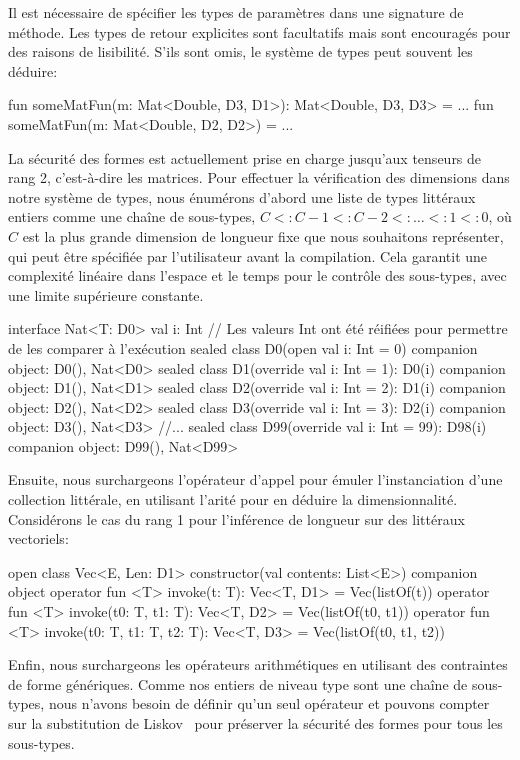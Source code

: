 %
Il est nécessaire de spécifier les types de paramètres dans une signature de méthode. Les types de retour explicites sont facultatifs mais sont encouragés pour des raisons de lisibilité. S'ils sont omis, le système de types peut souvent les déduire:
%
\begin{kotlinlisting}
fun someMatFun(m: Mat<Double, D3, D1>): Mat<Double, D3, D3> = ...
fun someMatFun(m: Mat<Double, D2, D2>) = ...
\end{kotlinlisting}
%
La sécurité des formes est actuellement prise en charge jusqu'aux tenseurs de rang 2, c'est-à-dire les matrices. Pour effectuer la vérification des dimensions dans notre système de types, nous énumérons d'abord une liste de types littéraux entiers comme une chaîne de sous-types, $C < : C - 1 < : C - 2 < : \dots < : 1 < : 0$, où $C$ est la plus grande dimension de longueur fixe que nous souhaitons représenter, qui peut être spécifiée par l'utilisateur avant la compilation. Cela garantit une complexité linéaire dans l'espace et le temps pour le contrôle des sous-types, avec une limite supérieure constante.
%
\begin{kotlinlisting}[caption={Type sécurisé pour les tenseurs de rang 1, $\forall C\leq2.$}]
interface Nat<T: D0> { val i: Int }
// Les valeurs Int ont été réifiées pour permettre de les comparer à l'exécution
sealed class D0(open val i: Int = 0) { companion object: D0(), Nat<D0> }
sealed class D1(override val i: Int = 1): D0(i) { companion object: D1(), Nat<D1> }
sealed class D2(override val i: Int = 2): D1(i) { companion object: D2(), Nat<D2> }
sealed class D3(override val i: Int = 3): D2(i) { companion object: D3(), Nat<D3> } //...
sealed class D99(override val i: Int = 99): D98(i) { companion object: D99(), Nat<D99> }
\end{kotlinlisting}
%
Ensuite, nous surchargeons l'opérateur d'appel pour émuler l'instanciation d'une collection littérale, en utilisant l'arité pour en déduire la dimensionnalité. Considérons le cas du rang 1 pour l'inférence de longueur sur des littéraux vectoriels:
%
\begin{kotlinlisting}
open class Vec<E, Len: D1> constructor(val contents: List<E>) {
    companion object {
        operator fun <T> invoke(t: T): Vec<T, D1> = Vec(listOf(t))
        operator fun <T> invoke(t0: T, t1: T): Vec<T, D2> = Vec(listOf(t0, t1))
        operator fun <T> invoke(t0: T, t1: T, t2: T): Vec<T, D3> = Vec(listOf(t0, t1, t2))
    }
}
\end{kotlinlisting}
%
Enfin, nous surchargeons les opérateurs arithmétiques en utilisant des contraintes de forme génériques. Comme nos entiers de niveau type sont une chaîne de sous-types, nous n'avons besoin de définir qu'un seul opérateur et pouvons compter sur la substitution de Liskov~\citep{liskov1987} pour préserver la sécurité des formes pour tous les sous-types.
